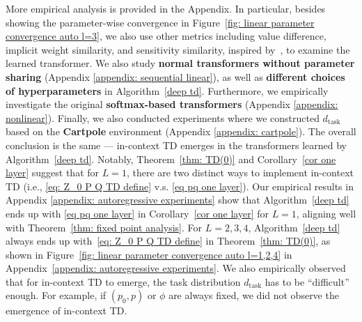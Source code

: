 \documentclass{article}
\newcommand{\newtext}[1]{{#1}}
\newcommand{\tb}[1]{{\textbf{#1}}}
\begin{document}
More empirical analysis is provided in the Appendix.
In particular,
besides showing the parameter-wise convergence in Figure~\ref{fig: linear parameter convergence auto l=3},
we also use other metrics including value difference,
implicit weight similarity, and sensitivity similarity,
inspired by~\citet{vonoswald2023transformers,akyurek2023learning},
to examine the learned transformer.
We also study \tb{normal transformers without parameter sharing }(Appendix \ref{appendix: sequential linear}),
as well as \tb{different choices of hyperparameters} in Algorithm~\ref{deep td}.
Furthermore, we empirically investigate the original \tb{softmax-based transformers} (Appendix \ref{appendix: nonlinear}). \newtext{Finally, we also conducted experiments where we constructed $d_{\text{task}}$ based on the \textbf{Cartpole} environment \citep{brockman2016openai} (Appendix \ref{appendix: cartpole})}. 
The overall conclusion is the same --- in-context TD emerges in the transformers learned by Algorithm~\ref{deep td}.
Notably, Theorem~\ref{thm: TD(0)} and Corollary~\ref{cor one layer} suggest that for $L=1$,
there are two distinct ways to implement in-context TD (i.e., \eqref{eq: Z_0 P Q TD define} v.s. \eqref{eq pq one layer}).
Our empirical results in Appendix \ref{appendix: autoregressive experiments} show that Algorithm~\ref{deep td} ends up with \eqref{eq pq one layer} in Corollary~\ref{cor one layer} for $L=1$,
aligning well with Theorem~\ref{thm: fixed point analysis}.
For $L=2,3,4$,
Algorithm~\ref{deep td} always ends up with~\eqref{eq: Z_0 P Q TD define} in Theorem~\ref{thm: TD(0)},
as shown in Figure~\ref{fig: linear parameter convergence auto l=1,2,4} in Appendix~\ref{appendix: autoregressive experiments}.
We also empirically observed that for in-context TD to emerge,
the task distribution $d_\text{task}$ has to be ``difficult'' enough.
For example, 
if $(p_0, p)$ or $\phi$ are always fixed,
we did not observe the emergence of in-context TD.
\end{document}

